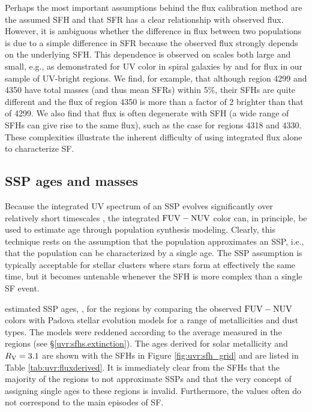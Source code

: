 Perhaps the most important assumptions behind the flux calibration method are
the assumed SFH and that SFR has a clear relationship with observed flux.
However, it is ambiguous whether the difference in flux between two populations
is due to a simple difference in SFR because the observed flux strongly depends
on the underlying SFH. This dependence is observed on scales both large and
small, e.g., as demonstrated for UV color in spiral galaxies by
\citet{Barnes:2011} and for \fuv{} flux in our sample of UV-bright regions. We find,
for example, that although region 4299 and 4350 have total masses (and thus
mean SFRs) within 5\%, their SFHs are quite different and the \fuv{} flux of
region 4350 is more than a factor of 2 brighter than that of 4299. We also find
that \fuv{} flux is often degenerate with SFH (a wide range of SFHs can give rise
to the same \fuv{} flux), such as the case for regions 4318 and 4330. These
complexities illustrate the inherent difficulty of using integrated flux alone
to characterize SF.



\subsection{SSP ages and masses}\label{uvr:discussion.ssp}

Because the integrated UV spectrum of an SSP evolves significantly over
relatively short timescales \citep[$\sim$ few Myr, as indicated in SSP models
from][]{Leitherer:1999}, the integrated $\mathrm{FUV} - \mathrm{NUV}$ color can, in
principle, be used to estimate age through population synthesis modeling.
Clearly, this technique rests on the assumption that the population
approximates an SSP, i.e., that the population can be characterized by a single
age. The SSP assumption is typically acceptable for stellar clusters where
stars form at effectively the same time, but it becomes untenable whenever the
SFH is more complex than a single SF event.

 estimated SSP ages, \agessp{}, for the regions
by comparing the observed $\mathrm{FUV} - \mathrm{NUV}$ colors with Padova stellar
evolution models \citep{Girardi:2010} for a range of metallicities and dust types.
The models were reddened according to the average \ebv{} measured in
the regions (see \S \ref{uvr:sfhs.extinction}). The ages derived for solar
metallicity and $R_\mathrm{V} = 3.1$ are shown with the SFHs in Figure
\ref{fig:uvr:sfh_grid} and are listed in Table \ref{tab:uvr:fluxderived}. It is
immediately clear from the SFHs that the majority of the regions to not
approximate SSPs and that the very concept of assigning single ages to these
regions is invalid. Furthermore, the \agessp{} values often do not
correspond to the main episodes of SF.

